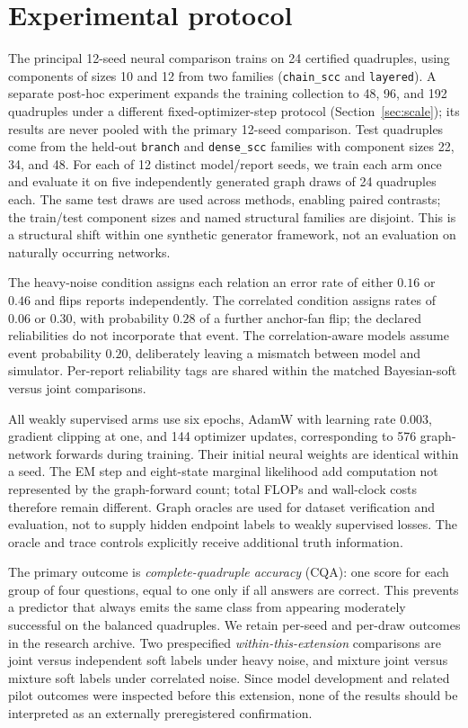 \documentclass[10pt]{article}
\begin{document}
\section{Experimental protocol}
The principal 12-seed neural comparison trains on 24 certified quadruples, using components of sizes 10 and 12 from two families (\texttt{chain\_scc} and \texttt{layered}). A separate post-hoc experiment expands the training collection to 48, 96, and 192 quadruples under a different fixed-optimizer-step protocol (Section~\ref{sec:scale}); its results are never pooled with the primary 12-seed comparison. Test quadruples come from the held-out \texttt{branch} and \texttt{dense\_scc} families with component sizes 22, 34, and 48. For each of 12 distinct model/report seeds, we train each arm once and evaluate it on five independently generated graph draws of 24 quadruples each. The same test draws are used across methods, enabling paired contrasts; the train/test component sizes and named structural families are disjoint. This is a structural shift within one synthetic generator framework, not an evaluation on naturally occurring networks.

The heavy-noise condition assigns each relation an error rate of either $0.16$ or $0.46$ and flips reports independently. The correlated condition assigns rates of $0.06$ or $0.30$, with probability $0.28$ of a further anchor-fan flip; the declared reliabilities do not incorporate that event. The correlation-aware models assume event probability $0.20$, deliberately leaving a mismatch between model and simulator. Per-report reliability tags are shared within the matched Bayesian-soft versus joint comparisons.

All weakly supervised arms use six epochs, AdamW with learning rate $0.003$, gradient clipping at one, and 144 optimizer updates, corresponding to 576 graph-network forwards during training. Their initial neural weights are identical within a seed. The EM step and eight-state marginal likelihood add computation not represented by the graph-forward count; total FLOPs and wall-clock costs therefore remain different. Graph oracles are used for dataset verification and evaluation, not to supply hidden endpoint labels to weakly supervised losses. The oracle and trace controls explicitly receive additional truth information.

The primary outcome is \emph{complete-quadruple accuracy} (CQA): one score for each group of four questions, equal to one only if all answers are correct. This prevents a predictor that always emits the same class from appearing moderately successful on the balanced quadruples. We retain per-seed and per-draw outcomes in the research archive. Two prespecified \emph{within-this-extension} comparisons are joint versus independent soft labels under heavy noise, and mixture joint versus mixture soft labels under correlated noise. Since model development and related pilot outcomes were inspected before this extension, none of the results should be interpreted as an externally preregistered confirmation.
\end{document}
